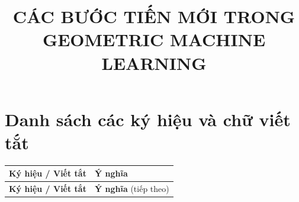 \documentclass[oneside]{hcmus-report}
\title{CÁC BƯỚC TIẾN MỚI TRONG GEOMETRIC MACHINE LEARNING}
\theoremstyle{plain}
\theoremstyle{definition}
\begin{document}
\coverpage%


\tableofcontents

\clearpage
{}
{}
\listoffigures

\clearpage
{}
{}
\listoftables

\clearpage
\section*{Danh sách các ký hiệu và chữ viết tắt}

\begin{longtable}{p{} p{}}
\textbf{Ký hiệu / Viết tắt} & \textbf{Ý nghĩa} \\
\hline
\endfirsthead

\textbf{Ký hiệu / Viết tắt} & \textbf{Ý nghĩa} (tiếp theo) \\
\hline
\endhead


\end{longtable}
\end{document}
